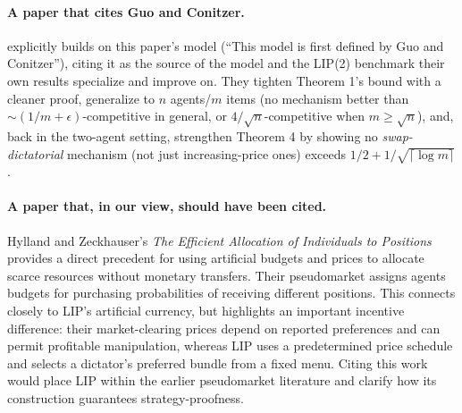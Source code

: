 \documentclass{article}
\begin{document}

\paragraph{A paper that cites Guo and Conitzer.} \cite{han2011strategy} explicitly builds on this paper's model (``This model is first defined by Guo and Conitzer''), citing it as the source of the model and the LIP(2) benchmark their own results specialize and improve on. They tighten Theorem 1's bound with a cleaner proof, generalize to $n$ agents/$m$ items (no mechanism better than $\sim(1/m+\epsilon)$-competitive in general, or $4/\sqrt n$-competitive when $m\ge\sqrt n$), and, back in the two-agent setting, strengthen Theorem 4 by showing no \emph{swap-dictatorial} mechanism (not just increasing-price ones) exceeds $1/2+1/\sqrt{\lceil\log m\rceil}$.

\paragraph{A paper that, in our view, should have been cited.}  Hylland and Zeckhauser's \emph{The Efficient Allocation of Individuals to Positions} \cite{HyllandZeckhauser1979} provides a direct precedent for using artificial budgets and prices to allocate scarce resources without monetary transfers. Their pseudomarket assigns agents budgets for purchasing probabilities of receiving different positions. This connects closely to LIP's artificial currency, but highlights an important incentive difference: their market-clearing prices depend on reported preferences and can permit profitable manipulation, whereas LIP uses a predetermined price schedule and selects a dictator's preferred bundle from a fixed menu. Citing this work would place LIP within the earlier pseudomarket literature and clarify how its construction guarantees strategy-proofness.
\end{document}
